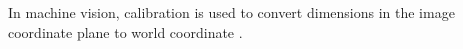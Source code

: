 \documentclass{article}
\begin{document}
	
	In machine vision, calibration is used to convert dimensions in the image coordinate plane to world coordinate \cite{moru2020machine}.
	
	\newpage
	
	
	
	
	
\end{document}
